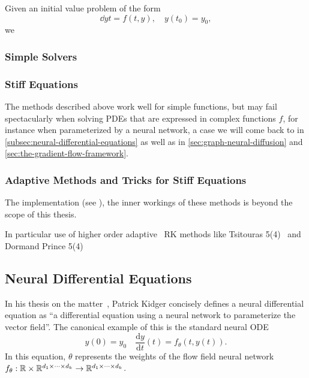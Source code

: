 \documentclass[../main.tex]{subfiles}
\begin{document}
    Given an initial value problem of the form
    \begin{equation}
        \dd yt = f(t, y), \quad y(t_0) = y_0,\label{eq:ivp}
    \end{equation}
    we

    \subsubsection{Simple Solvers}\label{subsubsec:simple-solvers}

    \subsubsection{Stiff Equations}\label{subsubsec:stiff-equations}
    The methods described above work well for simple functions, but may fail spectacularly when solving PDEs that are expressed in complex functions $f$, for instance when parameterized by a neural network, a case we will come back to in \autoref{subsec:neural-differential-equations} as well as in \autoref{sec:graph-neural-diffusion} and \autoref{sec:the-gradient-flow-framework}.
    

    \subsubsection{Adaptive Methods and Tricks for Stiff Equations}\label{subsubsec:adaptive-methods}
    The implementation (see ), the inner workings of these methods is beyond the scope of this thesis.

    In particular use of higher order adaptive~\cite{pressAdaptiveStepsizeRungeKutta1992a} RK methods like Tsitouras 5(4)~\cite{tsitourasRungeKuttaPairs2011} and Dormand Prince 5(4)~\cite{dormandFamilyEmbeddedRungeKutta1980}

    \subsection{Neural Differential Equations}\label{subsec:neural-differential-equations}
    In his thesis on the matter~\cite{kidgerNeuralDifferentialEquations2022}, Patrick Kidger concisely defines a neural differential equation as ``a differential equation using a neural network to parameterize the vector field''.
    The canonical example of this is the standard neural ODE
    \begin{equation}
        y(0) = y_0 \quad \frac{\mathrm dy}{\mathrm dt}(t) = f_{\theta}(t, y(t)).\label{eq:neural-ode}
    \end{equation}
    In this equation, $\theta$ represents the weights of the flow field neural network $f_{\theta}: \mathbb{R} \times \mathbb{R}^{d_1 \times \cdots \times d_k} \to \mathbb{R}^{d_1\times \cdots \times d_k}$.
\end{document}

